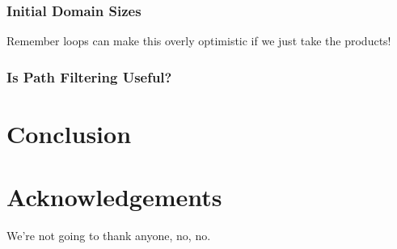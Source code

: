 \documentclass[letterpaper]{article}
\begin{document}
\subsubsection{Initial Domain Sizes}

Remember loops can make this overly optimistic if we just take the products!

\subsubsection{Is Path Filtering Useful?}

\section{Conclusion}

\section*{Acknowledgements}

We're not going to thank anyone, no, no.



\end{document}
